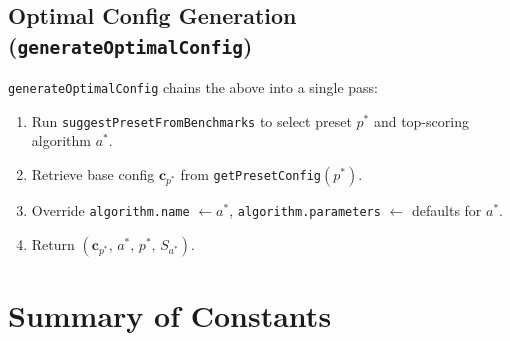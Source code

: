 \documentclass[11pt,a4paper]{article}
\begin{document}
\subsection{Optimal Config Generation (\texttt{generateOptimalConfig})}

\texttt{generateOptimalConfig} chains the above into a single pass:
\begin{enumerate}
  \item Run \texttt{suggestPresetFromBenchmarks} to select preset $p^*$ and
        top-scoring algorithm $a^*$.
  \item Retrieve base config $\mathbf{c}_{p^*}$ from \texttt{getPresetConfig}$(p^*)$.
  \item Override \texttt{algorithm.name} $\leftarrow a^*$,
        \texttt{algorithm.parameters} $\leftarrow$ defaults for $a^*$.
  \item Return $(\mathbf{c}_{p^*},\,a^*,\,p^*,\,S_{a^*})$.
\end{enumerate}

\section{Summary of Constants}
\end{document}
